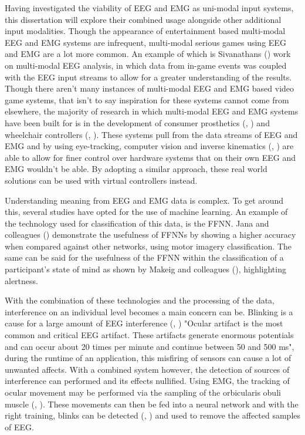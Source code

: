 \documentclass[11pt, a4paper]{article}
\newcommand{\ccite}[1]{(\citeauthor{#1}, \citeyear{#1})}
\newcommand{\cciteyear}[1]{(\citeyear{#1})}
\begin{document}
\hfill
  
Having investigated the viability of EEG and EMG as uni-modal input systems, this dissertation will explore their combined usage alongside other additional input modalities. Though the appearance of entertainment based multi-modal EEG and EMG systems are infrequent, multi-modal serious games using EEG and EMG are a lot more common. An example of which is Sivanathans \cciteyear{sivanathan2014temporal} work on multi-modal EEG analysis, in which data from in-game events was coupled with the EEG input streams to allow for a greater understanding of the results. Though there aren't many instances of multi-modal EEG and EMG based video game systems, that isn't to say inspiration for these systems cannot come from elsewhere, the majority of research in which multi-modal EEG and EMG systems have been built for is in the development of consumer prosthetics \ccite{shi2019novel} and wheelchair controllers \ccite{carlson2013brain}. These systems pull from the data streams of EEG and EMG and by using eye-tracking, computer vision and inverse kinematics \ccite{mcmullen2013demonstration} are able to allow for finer control over hardware systems that on their own EEG and EMG wouldn't be able. By adopting a similar approach, these real world solutions can be used with virtual controllers instead. 

\hfill

Understanding meaning from EEG and EMG data is complex. To get around this, several studies have opted for the use of machine learning. An example of the technology used for classification of this data, is the FFNN. Jana and colleagues \cciteyear{jana2018enhancing} demonstrate the usefulness of FFNNs by showing a higher accuracy when compared against other networks, using motor imagery classification. The same can be said for the usefulness of the FFNN within the classification of a participant's state of mind as shown by Makeig and colleagues \cciteyear{makeig1995using}, highlighting alertness. 

\hfill

With the combination of these technologies and the processing of the data, interference on an individual level becomes a main concern can be. Blinking is a cause for a large amount of EEG interference \ccite{kasim2022effective} "Ocular artifact is the most common and critical EEG artifact. These artifacts generate enormous potentials and can occur about 20 times per minute and continue between 50 and 500 ms", during the runtime of an application, this misfiring of sensors can cause a lot of unwanted affects. With a combined system however, the detection of sources of interference can performed and its effects nullified. Using EMG, the tracking of ocular movement may be performed via the sampling of the orbicularis obuli muscle \ccite{frigerio2014surface}. These movements can then be fed into a neural network and with the right training, blinks can be detected \ccite{erkaymaz2015detection} and used to remove the affected samples of EEG. 
\end{document}
